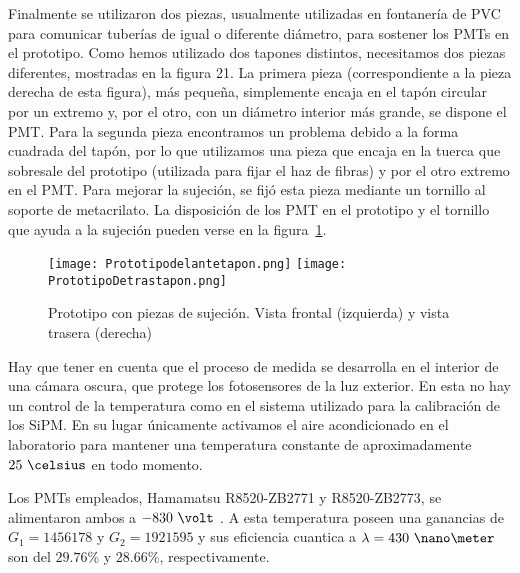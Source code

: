 Finalmente se utilizaron dos piezas, usualmente utilizadas en fontanería de PVC para comunicar tuberías de igual o diferente diámetro, para sostener los PMTs en el prototipo. Como hemos utilizado dos tapones distintos, necesitamos dos piezas diferentes, mostradas en la figura 21.
La primera pieza (correspondiente a la pieza derecha de esta figura), más pequeña, simplemente encaja en el  tapón circular por un extremo y, por el otro, con un diámetro interior más grande, se dispone el PMT.
Para la segunda pieza encontramos un problema debido a la forma cuadrada del tapón, por lo que utilizamos una pieza  que encaja en la tuerca que sobresale del prototipo (utilizada para fijar el haz de fibras) y por el otro extremo  en  el PMT. Para mejorar la sujeción, se fijó  esta pieza  mediante un tornillo  al soporte de metacrilato. La disposición de los PMT en el prototipo y el tornillo que ayuda a la sujeción pueden verse  en  la figura~\ref{prototipotapones}.

\begin{figure}[htb]
\centering
{
\texttt{[image: Prototipodelantetapon.png]} 
}
{
\texttt{[image: PrototipoDetrastapon.png]} 
}
\caption{Prototipo con piezas de sujeción. Vista frontal (izquierda) y vista trasera (derecha) \label{prototipotapones}}
\end{figure} 

Hay que tener en cuenta que el proceso de medida se desarrolla en el interior de una cámara oscura, que  protege los fotosensores  de la  luz exterior. En esta no hay un control de la temperatura como en el sistema utilizado para la calibración de los SiPM. En su lugar únicamente activamos el aire acondicionado en el laboratorio para mantener una temperatura constante de aproximadamente $25~\celsius$ en todo momento.

Los PMTs empleados, Hamamatsu R8520-ZB2771 y R8520-ZB2773, se alimentaron ambos a $-830~\volt$ . A esta temperatura poseen  una ganancias de $G_1=1456178$ y $G_2=1921595$ y sus eficiencia cuantica a $\lambda=430~\nano\meter$ son del $29.76\%$ y $28.66\%$, respectivamente. 
